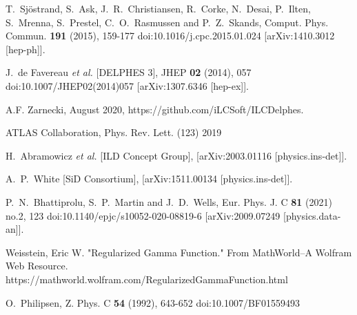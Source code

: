 \begin{thebibliography}{1}
    T.~Sj\"ostrand, S.~Ask, J.~R.~Christiansen, R.~Corke, N.~Desai, P.~Ilten, S.~Mrenna, S.~Prestel, C.~O.~Rasmussen and P.~Z.~Skands,
    Comput. Phys. Commun. \textbf{191} (2015), 159-177
    doi:10.1016/j.cpc.2015.01.024
    [arXiv:1410.3012 [hep-ph]].
    
    J.~de Favereau \textit{et al.} [DELPHES 3],
    JHEP \textbf{02} (2014), 057
    doi:10.1007/JHEP02(2014)057
    [arXiv:1307.6346 [hep-ex]].
    
    A.F. Zarnecki, August 2020, https://github.com/iLCSoft/ILCDelphes.
    
    ATLAS Collaboration, Phys. Rev. Lett. (123) 2019
    
    H.~Abramowicz \textit{et al.} [ILD Concept Group],
    [arXiv:2003.01116 [physics.ins-det]].

A.~P.~White [SiD Consortium],
[arXiv:1511.00134 [physics.ins-det]].

P.~N.~Bhattiprolu, S.~P.~Martin and J.~D.~Wells,
Eur. Phys. J. C \textbf{81} (2021) no.2, 123
doi:10.1140/epjc/s10052-020-08819-6
[arXiv:2009.07249 [physics.data-an]].

Weisstein, Eric W. "Regularized Gamma Function." From MathWorld--A Wolfram Web Resource. https://mathworld.wolfram.com/RegularizedGammaFunction.html
\end{thebibliography}

O.~Philipsen,
Z. Phys. C \textbf{54} (1992), 643-652
doi:10.1007/BF01559493
